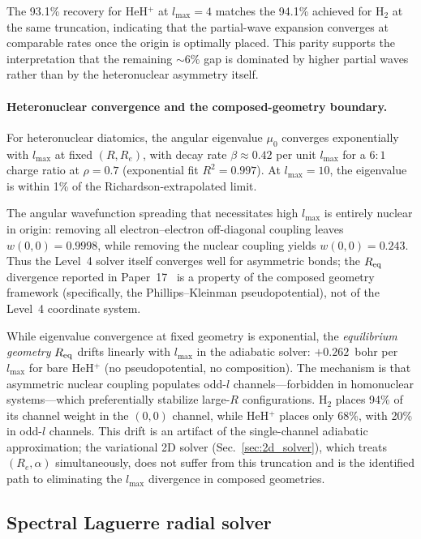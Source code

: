 \documentclass[aps,pra,twocolumn,superscriptaddress,longbibliography]{revtex4-2}
\begin{document}
The 93.1\% recovery for HeH$^+$ at $l_{\max} = 4$ matches the
94.1\% achieved for H$_2$ at the same truncation, indicating
that the partial-wave expansion converges at comparable rates
once the origin is optimally placed.  This parity supports the
interpretation that the remaining ${\sim}6\%$ gap is dominated
by higher partial waves rather than by the heteronuclear
asymmetry itself.

\paragraph{Heteronuclear convergence and the composed-geometry
boundary.}
For heteronuclear diatomics, the angular eigenvalue $\mu_0$
converges exponentially with $l_{\max}$ at fixed $(R, R_e)$,
with decay rate $\beta \approx 0.42$ per unit $l_{\max}$ for a
$6{:}1$ charge ratio at $\rho = 0.7$ (exponential fit
$R^2 = 0.997$).  At $l_{\max} = 10$, the eigenvalue is within
1\% of the Richardson-extrapolated limit.

The angular wavefunction spreading that necessitates high
$l_{\max}$ is entirely nuclear in origin: removing all
electron--electron off-diagonal coupling leaves
$w(0{,}0) = 0.9998$, while removing the nuclear coupling yields
$w(0{,}0) = 0.243$.  Thus the Level~4 solver itself converges
well for asymmetric bonds; the $R_{\rm eq}$ divergence reported
in Paper~17~\cite{paper17} is a property of the composed geometry
framework (specifically, the Phillips--Kleinman pseudopotential),
not of the Level~4 coordinate system.

While eigenvalue convergence at fixed geometry is exponential,
the \emph{equilibrium geometry} $R_{\rm eq}$ drifts linearly
with $l_{\max}$ in the adiabatic solver: $+0.262$~bohr per
$l_{\max}$ for bare HeH$^+$ (no pseudopotential, no composition).
The mechanism is that asymmetric nuclear coupling populates odd-$l$
channels---forbidden in homonuclear systems---which preferentially
stabilize large-$R$ configurations.  H$_2$ places 94\% of its
channel weight in the $(0{,}0)$ channel, while HeH$^+$ places only
68\%, with 20\% in odd-$l$ channels.  This drift is an artifact
of the single-channel adiabatic approximation; the variational
2D solver (Sec.~\ref{sec:2d_solver}), which treats
$(R_e, \alpha)$ simultaneously, does not suffer from this
truncation and is the identified path to eliminating the
$l_{\max}$ divergence in composed geometries.

\subsection{Spectral Laguerre radial solver}
\label{sec:spectral_radial_l4}
\end{document}
